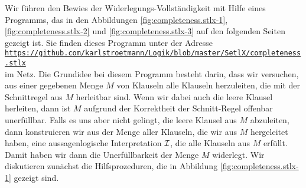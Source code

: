 Wir führen den Bewies der Widerlegungs-Vollständigkeit mit Hilfe eines Programms, das in den
Abbildungen \ref{fig:completeness.stlx-1}, \ref{fig:completeness.stlx-2} und
\ref{fig:completeness.stlx-3} auf den folgenden Seiten gezeigt ist.  Sie finden dieses Programm unter der Adresse
\\[0.2cm]
\hspace*{0.8cm}
\href{https://github.com/karlstroetmann/Logik/blob/master/SetlX/completeness.stlx}{\texttt{https://github.com/karlstroetmann/Logik/blob/master/SetlX/completeness.stlx}}
\\[0.2cm]
im Netz.  Die Grundidee
bei diesem Programm besteht darin, dass wir versuchen, aus einer gegebenen Menge $M$ von Klauseln
alle Klauseln herzuleiten, die mit der Schnittregel aus $M$ herleitbar sind.  Wenn wir dabei auch
die leere Klausel herleiten, dann ist $M$ aufgrund der Korrektheit der Schnitt-Regel offenbar
unerfüllbar.  Falls es uns aber nicht gelingt, die leere Klausel aus $M$ abzuleiten, dann konstruieren wir
aus der Menge aller Klauseln, die wir aus $M$ hergeleitet haben, eine aussagenlogische Interpretation
$\mathcal{I}$, die alle Klauseln aus $M$ erfüllt.  Damit haben wir dann die Unerfüllbarkeit der Menge $M$ widerlegt.
Wir diskutieren zunächst die Hilfsprozeduren, die in Abbildung \ref{fig:completeness.stlx-1} gezeigt
sind. 
